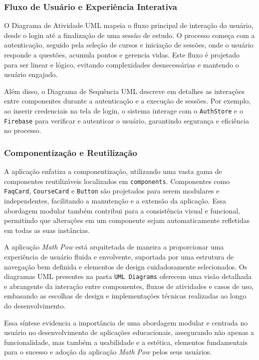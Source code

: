 \subsubsection{Fluxo de Usuário e Experiência Interativa}

O Diagrama de Atividade UML mapeia o fluxo principal de interação do usuário, desde o login até a finalização de uma sessão de estudo. O processo começa com a autenticação, seguido pela seleção de cursos e iniciação de sessões, onde o usuário responde a questões, acumula pontos e gerencia vidas. Este fluxo é projetado para ser linear e lógico, evitando complexidades desnecessárias e mantendo o usuário engajado.

Além disso, o Diagrama de Sequência UML descreve em detalhes as interações entre componentes durante a autenticação e a execução de sessões. Por exemplo, ao inserir credenciais na tela de login, o sistema interage com o \texttt{AuthStore} e o \texttt{Firebase} para verificar e autenticar o usuário, garantindo segurança e eficiência no processo.

\subsubsection{Componentização e Reutilização}

A aplicação enfatiza a componentização, utilizando uma vasta gama de componentes reutilizáveis localizados em \texttt{components}. Componentes como \texttt{FaqCard}, \texttt{CourseCard} e \texttt{Button} são projetados para serem modulares e independentes, facilitando a manutenção e a extensão da aplicação. Essa abordagem modular também contribui para a consistência visual e funcional, permitindo que alterações em um componente sejam automaticamente refletidas em todas as suas instâncias.

A aplicação \textit{Math Pow} está arquitetada de maneira a proporcionar uma experiência de usuário fluida e envolvente, suportada por uma estrutura de navegação bem definida e elementos de design cuidadosamente selecionados. Os diagramas UML presentes na pasta \texttt{UML Diagrams} oferecem uma visão detalhada e abrangente da interação entre componentes, fluxos de atividades e casos de uso, embasando as escolhas de design e implementações técnicas realizadas ao longo do desenvolvimento.

Essa síntese evidencia a importância de uma abordagem modular e centrada no usuário no desenvolvimento de aplicações educacionais, assegurando não apenas a funcionalidade, mas também a usabilidade e a estética, elementos fundamentais para o sucesso e adoção da aplicação \textit{Math Pow} pelos seus usuários.